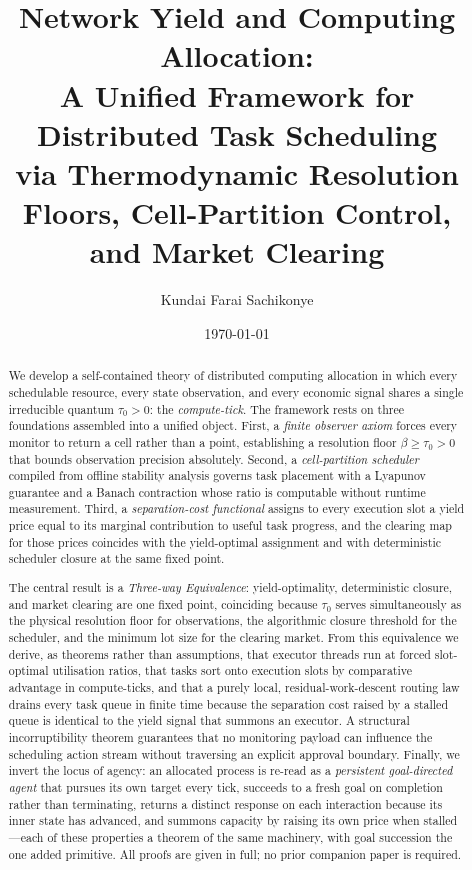\documentclass[11pt,twocolumn,a4paper]{article}
\title{\textbf{Network Yield and Computing Allocation:\\
A Unified Framework for Distributed Task Scheduling\\
via Thermodynamic Resolution Floors, Cell-Partition Control,\\
and Market Clearing}}
\author{Kundai Farai Sachikonye}
\date{\today}
\theoremstyle{plain}
\theoremstyle{definition}
\theoremstyle{remark}
\newcommand{\tick}{\tau_0}
\newcommand{\floor}{\beta}
\begin{document}
\maketitle

\begin{abstract}
We develop a self-contained theory of distributed computing allocation in which every schedulable resource, every state observation, and every economic signal shares a single irreducible quantum $\tick > 0$: the \emph{compute-tick}. The framework rests on three foundations assembled into a unified object. First, a \emph{finite observer axiom} forces every monitor to return a cell rather than a point, establishing a resolution floor $\floor \geq \tick > 0$ that bounds observation precision absolutely. Second, a \emph{cell-partition scheduler} compiled from offline stability analysis governs task placement with a Lyapunov guarantee and a Banach contraction whose ratio is computable without runtime measurement. Third, a \emph{separation-cost functional} assigns to every execution slot a yield price equal to its marginal contribution to useful task progress, and the clearing map for those prices coincides with the yield-optimal assignment and with deterministic scheduler closure at the same fixed point.

The central result is a \emph{Three-way Equivalence}: yield-optimality, deterministic closure, and market clearing are one fixed point, coinciding because $\tick$ serves simultaneously as the physical resolution floor for observations, the algorithmic closure threshold for the scheduler, and the minimum lot size for the clearing market. From this equivalence we derive, as theorems rather than assumptions, that executor threads run at forced slot-optimal utilisation ratios, that tasks sort onto execution slots by comparative advantage in compute-ticks, and that a purely local, residual-work-descent routing law drains every task queue in finite time because the separation cost raised by a stalled queue is identical to the yield signal that summons an executor. A structural incorruptibility theorem guarantees that no monitoring payload can influence the scheduling action stream without traversing an explicit approval boundary. Finally, we invert the locus of agency: an allocated process is re-read as a \emph{persistent goal-directed agent} that pursues its own target every tick, succeeds to a fresh goal on completion rather than terminating, returns a distinct response on each interaction because its inner state has advanced, and summons capacity by raising its own price when stalled---each of these properties a theorem of the same machinery, with goal succession the one added primitive. All proofs are given in full; no prior companion paper is required.
\end{abstract}
\end{document}
